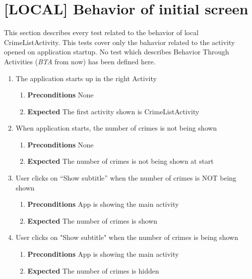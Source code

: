 \documentclass{article}
\begin{document}
\newcommand{\pre}{Preconditions}
\newcommand{\xpec}{Expected}

\section{[LOCAL] Behavior of initial screen}

This section describes every test related to the behavior of local CrimeListActivity. This tests cover only the bahavior related to the activity opened on application startup. No test which describes Behavior Through Activities (\textit{BTA} from now) has been defined here.

\begin{enumerate}

  \item The application starts up in the right Activity
  \begin{enumerate}
    \item \textbf{\pre} None
    \item \textbf{\xpec} The first activity shown is CrimeListActivity
  \end{enumerate}
  
  \item When application starts, the number of crimes is not being shown
  \begin{enumerate}
   \item \textbf{\pre} None
   \item \textbf{Expected} The number of crimes is not being shown at start
  \end{enumerate}
  
  \item User clicks on ``Show subtitle'' when the number of crimes is NOT being shown
  \begin{enumerate}
   \item \textbf{\pre} App is showing the main activity
   \item \textbf{Expected} The number of crimes is shown
  \end{enumerate}
    
  \item User clicks on "Show subtitle" when the number of crimes is being shown
  \begin{enumerate}
   \item \textbf{\pre} App is showing the main activity
   \item \textbf{Expected} The number of crimes is hidden
  \end{enumerate}
    

\end{enumerate}
\end{document}
